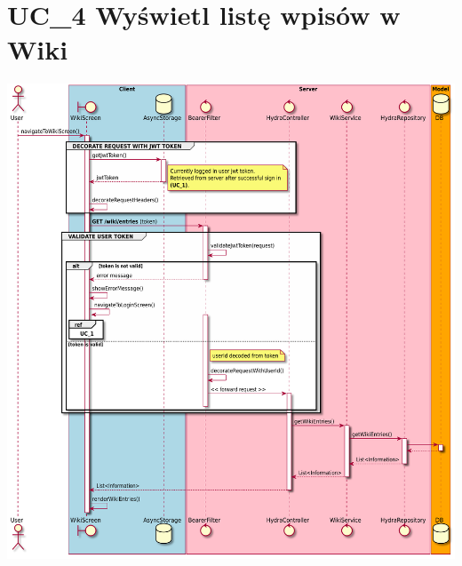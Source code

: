 \documentclass[oneside]{scrreprt}
\begin{document}
\section{UC\_4 Wyświetl listę wpisów w Wiki}
\includegraphics[width=\textwidth, keepaspectratio]{graphics/sequence_diagram_wiki_list.pdf}
\end{document}
